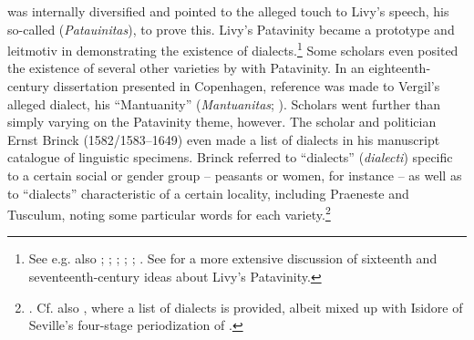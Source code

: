 was internally diversified and pointed to the alleged  touch to Livy’s speech, his so-called  (\textit{Patauinitas}), to prove this. Livy’s Patavinity became a prototype and leitmotiv in demonstrating the existence of  dialects.\footnote{See e.g. also \citet[b.viii\textsc{\textsuperscript{v}}]{Castiglione1528}; \citet[*.iii\textsc{\textsuperscript{r}}]{Estienne1582}; \citet[174, 176]{Schottel1663}; \citet[311]{Rice1765}; \citet[: \textsc{lix}]{Mazzarella-farao1779}; \citet[203--204]{Ries1786}. See \citet{VanRooy2018a} for a more extensive discussion of sixteenth and seventeenth-century ideas about Livy’s Patavinity.} Some scholars even posited the existence of several other  varieties by  with Patavinity. In an eighteenth-century dissertation presented in Copenhagen, reference was made to Vergil’s alleged  dialect, his “Mantuanity” (\textit{Mantuanitas}; \citealt[22]{Munthe1748}). Scholars went further than simply varying on the Patavinity theme, however. The  scholar and politician Ernst Brinck (1582/1583–1649) even made a list of  dialects in his manuscript catalogue of linguistic specimens. Brinck referred to “dialects” (\textit{dialecti}) specific to a certain social or gender group – peasants or women, for instance – as well as to “dialects” characteristic of a certain locality, including Praeneste and Tusculum, noting some particular words for each variety.\footnote{\citet[56\textsc{\textsuperscript{v}}]{Brinck1615}. Cf. also \citet[43]{Stubbe1657}, where a list of  dialects is provided, albeit mixed up with Isidore of Seville’s four-stage periodization of .}

